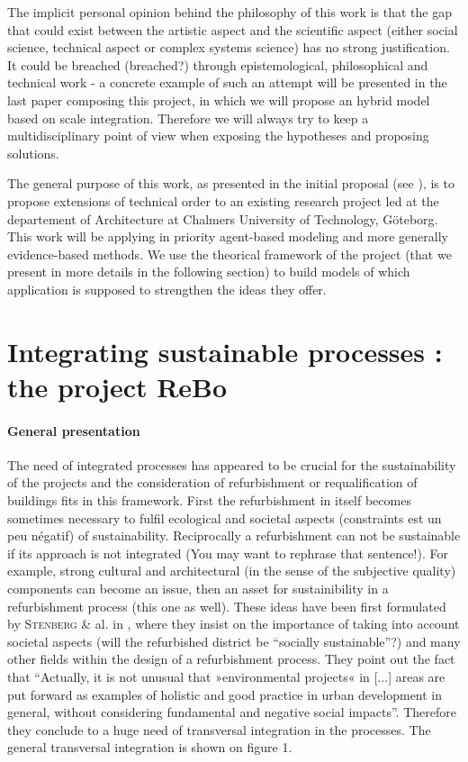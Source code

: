\documentclass[english]{article}
\newcommand{\noun}[1]{\textsc{#1}}
\begin{document}
\bigskip{}


The implicit personal opinion behind the philosophy of this work is
that the gap that could exist between the artistic aspect and the
scientific aspect (either social science, technical aspect or
complex systems science) has no strong justification. It could
be breached (breached?) through epistemological, philosophical and technical work
- a concrete example of such an attempt will be presented in the last paper
composing this project, in which we will propose an hybrid model based
on scale integration. Therefore we will always try to keep a multidisciplinary
point of view when exposing the hypotheses and proposing solutions.

\bigskip{}


The general purpose of this work, as presented in the initial proposal
(see \cite{RaimbaultReBoDescription0412}), is to propose extensions
of technical order to an existing research project led at the departement
of Architecture at Chalmers University of Technology, Göteborg. This work will be
applying in priority agent-based modeling and more generally evidence-based
methods. We use the theorical framework of the project (that we present
in more details in the following section) to build models of which application
is supposed to strengthen the ideas they offer.


\section{Integrating sustainable processes : the project ReBo}


\paragraph{General presentation}

The need of integrated processes has appeared to be crucial for the sustainability
of the projects and the consideration of refurbishment or requalification of buildings fits in this framework. First the refurbishment
in itself becomes sometimes necessary to fulfil ecological and societal
aspects (constraints est un peu négatif) of sustainability. Reciprocally a refurbishment can
not be sustainable if its approach is not integrated (You may want to rephrase that sentence!). For example,
strong cultural and architectural (in the sense of the subjective
quality) components can become an issue, then an asset for sustainibility
in a refurbishment process (this one as well). These ideas have been first formulated
by \noun{Stenberg} \& al. in \cite{stenberg2009linking}, where they
insist on the importance of taking into account societal aspects (will
the refurbished district be ``socially sustainable''?) and many
other fields within the design of a refurbishment process. They point out
the fact that ``Actually, it is not unusual that »environmental projects«
in {[}...{]} areas are put forward as examples of holistic and good
practice in urban development in general, without considering fundamental
and negative social impacts''. Therefore they conclude to a huge need
of transversal integration in the processes. The general transversal
integration is shown on figure 1.
\end{document}
